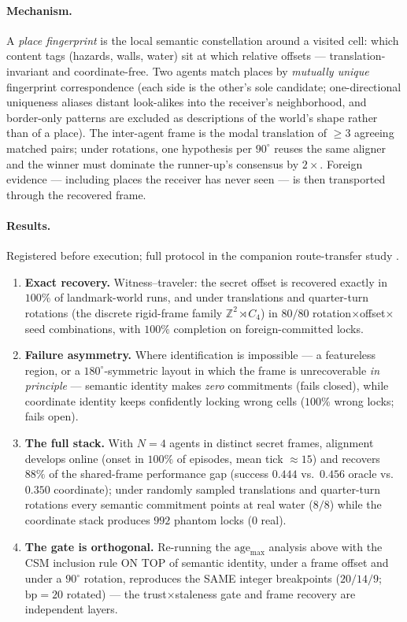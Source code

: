 \documentclass{article}
\begin{document}
\paragraph{Mechanism.} A \emph{place fingerprint} is the local
semantic constellation around a visited cell: which content tags
(hazards, walls, water) sit at which relative offsets ---
translation-invariant and coordinate-free. Two agents match places by
\emph{mutually unique} fingerprint correspondence (each side is the
other's sole candidate; one-directional uniqueness aliases distant
look-alikes into the receiver's neighborhood, and border-only
patterns are excluded as descriptions of the world's shape rather
than of a place). The inter-agent frame is the modal translation of
$\ge 3$ agreeing matched pairs; under rotations, one hypothesis per
$90^\circ$ reuses the same aligner and the winner must dominate the
runner-up's consensus by $2\times$. Foreign evidence --- including
places the receiver has never seen --- is then transported through
the recovered frame.

\paragraph{Results.} Registered before execution; full protocol in
the companion route-transfer study \citep{songlines2}.
\begin{enumerate}[leftmargin=20pt,itemsep=2pt,topsep=2pt]
\item \textbf{Exact recovery.} Witness--traveler: the secret offset is
  recovered exactly in $100\%$ of landmark-world runs, and under
  translations and quarter-turn rotations (the discrete rigid-frame
  family $\mathbb{Z}^2\rtimes C_4$) in $80/80$
  rotation$\times$offset$\times$seed combinations, with $100\%$
  completion on foreign-committed locks.
\item \textbf{Failure asymmetry.} Where identification is impossible
  --- a featureless region, or a $180^\circ$-symmetric layout in which
  the frame is unrecoverable \emph{in principle} --- semantic identity
  makes \emph{zero} commitments (fails closed), while coordinate
  identity keeps confidently locking wrong cells ($100\%$ wrong locks;
  fails open).
\item \textbf{The full stack.} With $N{=}4$ agents in distinct secret
  frames, alignment develops online (onset in $100\%$ of episodes,
  mean tick ${\approx}15$) and recovers $88\%$ of the shared-frame
  performance gap (success $0.444$ vs.\ $0.456$ oracle vs.\ $0.350$
  coordinate); under randomly sampled translations and quarter-turn
  rotations every semantic commitment
  points at real water ($8/8$) while the coordinate stack produces
  $992$ phantom locks ($0$ real).
\item \textbf{The gate is orthogonal.} Re-running the
  $\mathrm{age}_{\max}$ analysis above with the CSM inclusion rule ON
  TOP of semantic identity, under a frame offset and under a
  $90^\circ$ rotation, reproduces the SAME integer breakpoints
  ($20/14/9$; $\mathrm{bp}=20$ rotated) --- the trust$\times$staleness
  gate and frame recovery are independent layers.
\end{enumerate}
\end{document}
